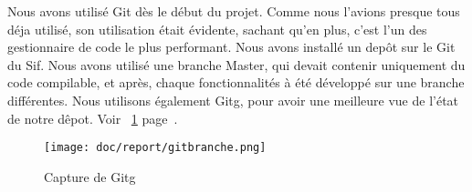 Nous avons utilisé Git dès le début du projet. Comme nous l'avions presque tous déja utilisé, son utilisation était évidente, sachant qu'en plus, c'est l'un des gestionnaire de code le plus performant.
Nous avons installé un depôt sur le Git du Sif. Nous avons utilisé une branche Master, qui devait contenir uniquement du code compilable, et après, chaque fonctionnalités à été développé sur une branche différentes.
Nous utilisons également Gitg, pour avoir une meilleure vue de l'état de notre dêpot. Voir ~\ref{Gitg} page~\pageref{Gitg}.
\begin{figure}[h]
\caption{\label{Gitg} Capture de Gitg}
\texttt{[image: doc/report/gitbranche.png]}
\end{figure}
